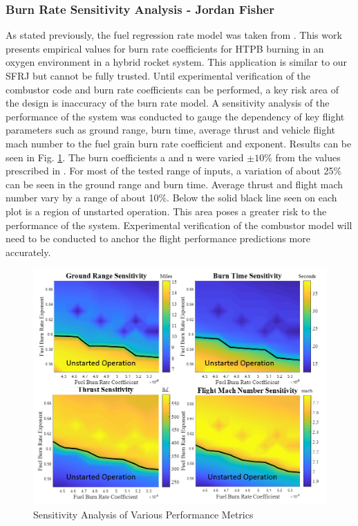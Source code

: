 \subsubsection{Burn Rate Sensitivity Analysis - Jordan Fisher}
As stated previously, the fuel regression rate model was taken from \cite{Pourpoint}. This work presents empirical values for burn rate coefficients for HTPB burning in an oxygen environment in a hybrid rocket system. This application is similar to our SFRJ but cannot be fully trusted. Until experimental verification of the combustor code and burn rate coefficients can be performed, a key risk area of the design is inaccuracy of the burn rate model. A sensitivity analysis of the performance of the system was conducted to gauge the dependency of key flight parameters such as ground range, burn time, average thrust and vehicle flight mach number to the fuel grain burn rate coefficient and exponent. Results can be seen in Fig. \ref{fig:sensitivity}. The burn coefficients a and n were varied $\pm 10\%$ from the values prescribed in \cite{Pourpoint}. For most of the tested range of inputs, a variation of about 25\% can be seen in the ground range and burn time. Average thrust and flight mach number vary by a range of about 10\%. Below the solid black line seen on each plot is a region of unstarted operation. This area poses a greater risk to the performance of the system. Experimental verification of the combustor model will need to be conducted to anchor the flight performance predictions more accurately.  \\ \indent



\begin{figure}[H]
\centering
\includegraphics[width=1\textwidth] {Combustor_Figures/sensitivity.PNG}
\caption{Sensitivity Analysis of Various Performance Metrics}
\label{fig:sensitivity}
\end{figure}




